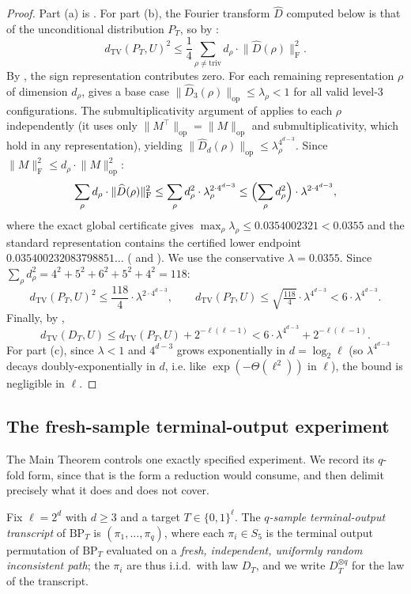 \documentclass[version=final]{iacrcc}
\newcommand{\norm}[1]{\lVert #1 \rVert}
\newcommand{\frob}[1]{\norm{#1}_{\mathrm{F}}}
\newcommand{\opn}[1]{\norm{#1}_{\mathrm{op}}}
\newcommand{\dtv}{d_{\mathrm{TV}}}
\newcommand{\Dhat}{\widehat{D}}
\newcommand{\BP}{\mathrm{BP}}
\begin{document}
\begin{proof}
Part (a) is . For part (b), the Fourier transform $\Dhat$
computed below is that of the unconditional distribution $P_T$, so by
:
\[
\dtv(P_T, U)^2 \leq \frac{1}{4} \sum_{\rho \neq \mathrm{triv}} d_\rho \cdot
\frob{\Dhat(\rho)}^2.
\]
By , the sign representation contributes zero.
For each remaining representation $\rho$ of dimension $d_\rho$,
 gives a base case
$\opn{\Dhat_3(\rho)} \leq \lambda_\rho < 1$ for all valid level-$3$
configurations. The submultiplicativity argument of 
applies to each $\rho$ independently (it uses only $\opn{M^\top} = \opn{M}$
and submultiplicativity, which hold in any representation), yielding
$\opn{\Dhat_d(\rho)} \leq \lambda_\rho^{4^{d-3}}$.
Since $\frob{M}^2 \leq d_\rho \cdot \opn{M}^2$:
\[
\sum_{\rho} d_\rho \cdot \frob{\Dhat(\rho)}^2
\leq \sum_{\rho} d_\rho^2 \cdot \lambda_\rho^{2 \cdot 4^{d-3}}
\leq \Bigl(\sum_{\rho} d_\rho^2\Bigr) \cdot \lambda^{2 \cdot 4^{d-3}},
\]
where the exact global certificate gives
$\max_\rho\lambda_\rho\le0.0354002321<0.0355$ and the standard representation
contains the certified lower endpoint $0.035400232083798851\ldots$
( and ). We use the conservative
$\lambda=0.0355$. Since
$\sum_\rho d_\rho^2 = 4^2 + 5^2 + 6^2 + 5^2 + 4^2 = 118$:
\[
\dtv(P_T, U)^2 \leq \frac{118}{4} \cdot \lambda^{2 \cdot 4^{d-3}},
\qquad
\dtv(P_T, U) \leq \sqrt{\tfrac{118}{4}} \cdot \lambda^{4^{d-3}}
< 6 \cdot \lambda^{4^{d-3}}.
\]
Finally, by ,
\[
\dtv(D_T, U) \leq \dtv(P_T, U) + 2^{-\ell(\ell-1)}
< 6 \cdot \lambda^{4^{d-3}} + 2^{-\ell(\ell-1)}.
\]
For part (c), since $\lambda < 1$ and $4^{d-3}$ grows exponentially in
$d = \log_2 \ell$ (so $\lambda^{4^{d-3}}$ decays doubly-exponentially in $d$,
i.e. like $\exp(-\Theta(\ell^2))$ in $\ell$), the bound is negligible in $\ell$.
\end{proof}

\subsection{The fresh-sample terminal-output experiment}
\label{subsec:terminal}

The Main Theorem controls one exactly specified experiment. We record its
$q$-fold form, since that is the form a reduction would consume, and then
delimit precisely what it does and does not cover.

\begin{definition}
\label{def:terminal}
Fix $\ell = 2^d$ with $d \geq 3$ and a target $T \in \{0,1\}^\ell$. The
\emph{$q$-sample terminal-output transcript} of $\BP_T$ is
$(\pi_1, \dots, \pi_q)$, where each $\pi_i \in S_5$ is the terminal output
permutation of $\BP_T$ evaluated on a \emph{fresh, independent, uniformly
random inconsistent path}; the $\pi_i$ are thus i.i.d.\ with law $D_T$, and we
write $D_T^{\otimes q}$ for the law of the transcript.
\end{definition}
\end{document}
